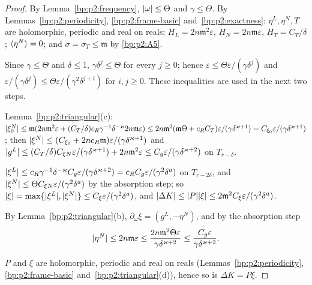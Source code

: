 \begin{proof}
\label{step:p2:cor-data}
By Lemma~\ref{bp:p2:frequency}, $\lvert \omega\rvert\le\Theta$ and $\gamma\le\Theta$. By
Lemmas~\ref{bp:p2:periodicity}, \ref{bp:p2:frame-basic} and~\ref{bp:p2:exactness}: $\eta^L,\eta^N,T$ are
holomorphic, periodic and real on reals; $H_L=2n\mathfrak m^2\varepsilon$, $H_N=2n\mathfrak m\varepsilon$,
$H_T=C_T/\delta$; $\langle \eta^N\rangle=0$; and $\sigma=\sigma_T\le\mathfrak m$ by \ref{bp:p2:A5}.

\label{step:p2:cor-absorb}
Since $\gamma\le\Theta$ and $\delta\le1$, $\gamma\delta^j\le\Theta$ for every $j\ge0$; hence
$\varepsilon\le\Theta\varepsilon/(\gamma\delta^j)$ and $\varepsilon/(\gamma\delta^j)\le\Theta
\varepsilon/(\gamma^2\delta^{j+i})$ for $i,j\ge0$. These inequalities are used in the next two steps.

\label{step:p2:cor-xin}
Lemma~\ref{bp:p2:triangular}(c): $\lvert \xi^N_0\rvert\le\mathfrak m(2n\mathfrak m^2\varepsilon+
(C_T/\delta)c_R\gamma^{-1}\delta^{-\varkappa}2n\mathfrak m\varepsilon)\le2n\mathfrak m^2(\mathfrak
m\Theta+c_RC_T)\varepsilon/(\gamma\delta^{\varkappa+1})=C_{\xi_0}\varepsilon/(\gamma\delta^{\varkappa+1})$;
then $\lvert \xi^N\rvert\le(C_{\xi_0}+2nc_R\mathfrak m)\varepsilon/(\gamma\delta^{\varkappa+1})$ and
$\lvert g^L\rvert\le(C_T/\delta)C_{\xi N}\varepsilon/(\gamma\delta^{\varkappa+1})+2n\mathfrak m^2\varepsilon\le
C_g\varepsilon/(\gamma\delta^{\varkappa+2})$ on $T_{r-\delta}$.

\label{step:p2:cor-xi}
$\lvert \xi^L\rvert\le c_R\gamma^{-1}\delta^{-\varkappa}C_g\varepsilon/(\gamma\delta^{\varkappa+2})=c_RC_g
\varepsilon/(\gamma^2\delta^a)$ on $T_{r-2\delta}$, and $\lvert \xi^N\rvert\le\Theta C_{\xi N}\varepsilon/
(\gamma^2\delta^a)$ by the absorption step; so $\lvert \xi\rvert=\max\{\lvert \xi^L\rvert,\lvert \xi^N\rvert\}\le C_\xi
\varepsilon/(\gamma^2\delta^a)$, and $\lvert \Delta K\rvert\le\lvert P\rvert\lvert \xi\rvert\le2\mathfrak m^2C_\xi\varepsilon/
(\gamma^2\delta^a)$.

\label{step:p2:cor-dxi}
By Lemma~\ref{bp:p2:triangular}(b), $\partial_\omega\xi=(g^L,-\eta^N)$, and by the absorption step
\[
\lvert \eta^N\rvert\le2n\mathfrak m\varepsilon\le\frac{2n\mathfrak m^2\Theta\varepsilon}{\gamma
\delta^{\varkappa+2}}\le\frac{C_g\varepsilon}{\gamma\delta^{\varkappa+2}}.
\]

\label{step:p2:cor-reg}
$P$ and $\xi$ are holomorphic, periodic and real on reals (Lemmas~\ref{bp:p2:periodicity},
\ref{bp:p2:frame-basic} and~\ref{bp:p2:triangular}(d)), hence so is $\Delta K=P\xi$.
\end{proof}

